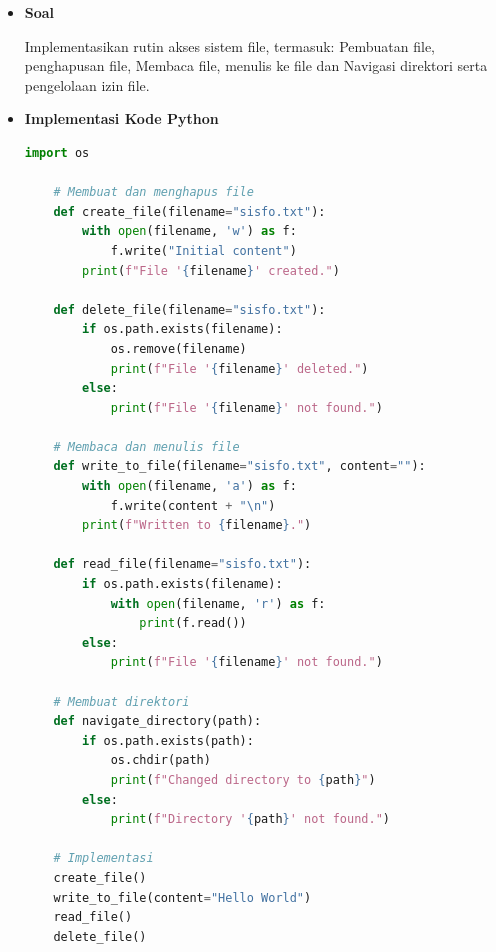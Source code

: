 \documentclass[12pt]{article}
\begin{document}
\begin{itemize}
    \item\textbf{Soal} 
    \par Implementasikan rutin akses sistem file, termasuk: Pembuatan file, penghapusan file, Membaca file, menulis ke file dan Navigasi direktori serta pengelolaan izin file.
    \item\textbf{Implementasi Kode Python}

        \lstset{style=mystyle}

    \begin{lstlisting}[language=Python, caption=File System Access]
    import os

    # Membuat dan menghapus file
    def create_file(filename="sisfo.txt"):
        with open(filename, 'w') as f:
            f.write("Initial content")
        print(f"File '{filename}' created.")
    
    def delete_file(filename="sisfo.txt"):
        if os.path.exists(filename):
            os.remove(filename)
            print(f"File '{filename}' deleted.")
        else:
            print(f"File '{filename}' not found.")
    
    # Membaca dan menulis file
    def write_to_file(filename="sisfo.txt", content=""):
        with open(filename, 'a') as f:
            f.write(content + "\n")
        print(f"Written to {filename}.")
    
    def read_file(filename="sisfo.txt"):
        if os.path.exists(filename):
            with open(filename, 'r') as f:
                print(f.read())
        else:
            print(f"File '{filename}' not found.")
    
    # Membuat direktori
    def navigate_directory(path):
        if os.path.exists(path):
            os.chdir(path)
            print(f"Changed directory to {path}")
        else:
            print(f"Directory '{path}' not found.")
    
    # Implementasi
    create_file()
    write_to_file(content="Hello World")
    read_file()
    delete_file()

    \end{lstlisting}

    \end{itemize}
\end{document}
